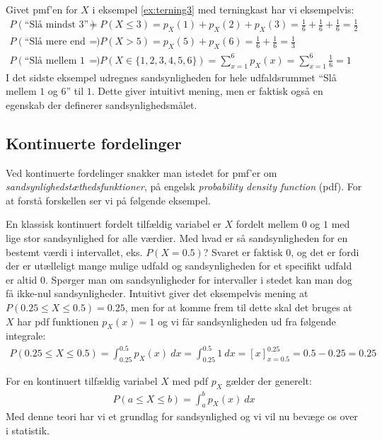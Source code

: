 \begin{example}
Givet pmf'en for $X$ i eksempel \ref{ex:terning3} med terningkast har vi eksempelvis:
\begin{align*}
P(\text{``Slå mindst 3''}) &= P(X \leq 3) = p_X(1) + p_X(2) + p_X(3) = \frac{1}{6} + \frac{1}{6} + \frac{1}{6} = \frac{1}{2} \\
P(\text{``Slå mere end 4''}) &= P(X > 5) = p_X(5) + p_X(6) = \frac{1}{6} + \frac{1}{6} = \frac{1}{3} \\ 
P(\text{``Slå mellem 1 og 6''}) &= P(X \in \{1,2,3,4,5,6\}) = \sum_{x = 1}^6 p_X(x) =  \sum_{x = 1}^6 \frac{1}{6} = 1
\end{align*}
I det sidste eksempel udregnes sandsynligheden for hele udfaldsrummet ``Slå mellem $1$ og $6$'' til $1$. Dette giver intuitivt mening, men er faktisk også en egenskab der definerer sandsynlighedsmålet. 
\end{example}
%
\subsection{Kontinuerte fordelinger}
Ved kontinuerte fordelinger snakker man istedet for pmf'er om \textit{sandsynlighedstæthedsfunktioner}, på engelsk \textit{probability density function} (pdf). For at forstå forskellen ser vi på følgende eksempel.
\begin{example} \label{ex:unif1}
En klassisk kontinuert fordelt tilfældig variabel er $X$ fordelt mellem $0$ og $1$ med lige stor sandsynlighed for alle værdier. Med hvad er så sandsynligheden for en bestemt værdi i intervallet, eks. $P(X = 0.5)$? Svaret er faktisk $0$, og det er fordi der er utælleligt mange mulige udfald og sandsynligheden for et specifikt udfald er altid $0$. Spørger man om sandsynligheder for intervaller i stedet kan man dog få ikke-nul sandsynligheder. Intuitivt giver det eksempelvis mening at $P(0.25 \leq X \leq 0.5) = 0.25$, men for at komme frem til dette skal det bruges at $X$ har pdf funktionen $p_X(x) = 1$ og vi får sandsynligheden ud fra følgende integrale:
\begin{align*}
P(0.25 \leq X \leq 0.5) = \int_{0.25}^{0.5} p_X(x) \ dx = \int_{0.25}^{0.5} 1 \ dx = \left[x \right]_{x = 0.5}^{0.25} = 0.5 - 0.25 = 0.25
\end{align*}
\end{example} 
For en kontinuert tilfældig variabel $X$ med pdf $p_X$ gælder der generelt:
\begin{align*}
P(a \leq X \leq b) = \int_a^b p_X(x) \ dx
\end{align*}
Med denne teori har vi et grundlag for sandsynlighed og vi vil nu bevæge os over i statistik. 